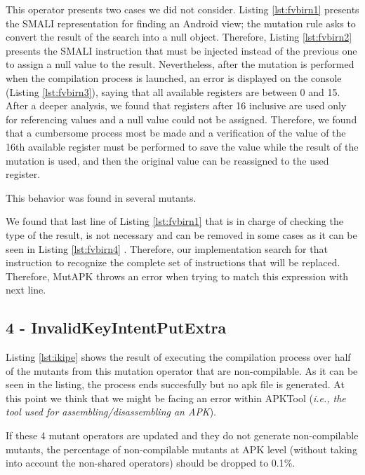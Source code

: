 This operator presents two cases we did not consider. Listing \ref{lst:fvbirn1} presents the SMALI representation for finding an Android view; the mutation rule asks to convert the result of the search into a null object. Therefore, Listing \ref{lst:fvbirn2} presents the  SMALI instruction that must be injected instead of the previous one to assign a null value to the result. Nevertheless, after the mutation is performed when the compilation process is launched, an error is displayed on the console (Listing \ref{lst:fvbirn3}), saying that all available registers are between 0 and 15. After a deeper analysis, we found that registers after 16 inclusive are used only for referencing values and a null value could not be assigned. Therefore, we found that a cumbersome process most be made and a verification of the value of the 16th available register must be performed to save the value while the result of the mutation is used, and then the original value can be reassigned to the used register.

This behavior was found in several mutants.

We found that last line of Listing \ref{lst:fvbirn1} that is in charge of checking the type of the result, is not necessary and can be removed in some cases as it can be seen in Listing \ref{lst:fvbirn4} . Therefore, our implementation search for that instruction to recognize the complete set of instructions that will be replaced. Therefore, MutAPK throws an error when trying to match this expression with next line.

\subsection{4 - InvalidKeyIntentPutExtra}

Listing \ref{lst:ikipe} shows the result of executing the compilation process over half of the mutants from this mutation operator that are non-compilable. As it can be seen in the listing, the process ends succesfully but no apk file is generated. At this point we think that we might be facing an error within APKTool (\textit{i.e., the tool used for assembling/disassembling an APK}).

If these 4 mutant operators are updated and they do not generate non-compilable mutants, the percentage of non-compilable mutants at APK level (without taking into account the non-shared operators) should be dropped to 0.1\%.





